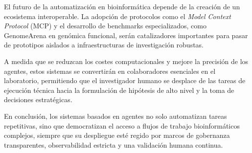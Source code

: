 El futuro de la automatización en bioinformática depende de la creación de un
ecosistema interoperable. La adopción de protocolos como el \textit{Model
Context Protocol} (MCP) y el desarrollo de benchmarks especializados, como
GenomeArena en genómica funcional, serán catalizadores importantes para pasar
de prototipos aislados a infraestructuras de investigación robustas.

A medida que se reduzcan los costes computacionales y mejore la precisión de los
agentes, estos sistemas se convertirán en colaboradores esenciales en el
laboratorio, permitiendo que el investigador humano se desplace de las tareas de
ejecución técnica hacia la formulación de hipótesis de alto nivel y la toma de
decisiones estratégicas.

En conclusión, los sistemas basados en agentes no solo automatizan tareas
repetitivas, sino que democratizan el acceso a flujos de trabajo bioinformáticos
complejos, siempre que su despliegue esté regido por marcos de gobernanza
transparentes, observabilidad estricta y una validación humana continua.
